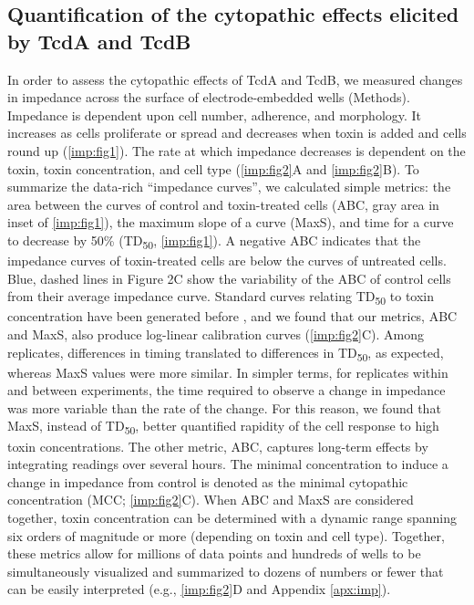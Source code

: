 \subsection{Quantification of the cytopathic effects 
              elicited by TcdA and TcdB}
In order to assess the cytopathic effects of TcdA and TcdB, 
we measured changes in impedance across the surface of 
electrode-embedded wells (Methods). Impedance is dependent 
upon cell number, adherence, and morphology. It increases 
as cells proliferate or spread and decreases when toxin is 
added and cells round up (\autoref{imp:fig1}). The rate at which impedance 
decreases is dependent on the toxin, toxin concentration, and cell 
type (\autoref{imp:fig2}A and \autoref{imp:fig2}B). To summarize the data-rich 
``impedance curves'', we calculated simple metrics: the 
area between the curves of control and toxin-treated cells 
(ABC, gray area in inset of \autoref{imp:fig1}), the maximum slope of 
a curve (MaxS), and time for a curve to decrease by 50\% (TD\textsubscript{50}, 
\autoref{imp:fig1}). A negative ABC indicates that the impedance curves 
of toxin-treated cells are below the curves of untreated 
cells. Blue, dashed lines in Figure 2C show the variability 
of the ABC of control cells from their average impedance 
curve. Standard curves relating TD\textsubscript{50} to toxin concentration 
have been generated before \cite{Xu:2012db}, and we found that our 
metrics, ABC and MaxS, also produce log-linear calibration 
curves (\autoref{imp:fig2}C). Among replicates, differences in 
timing translated to differences in TD\textsubscript{50}, as expected, 
whereas MaxS values were more similar. In simpler terms, 
for replicates within and between experiments, the time 
required to observe a change in impedance was more 
variable than the rate of the change. For this reason, 
we found that MaxS, instead of TD\textsubscript{50}, better quantified 
rapidity of the cell response to high toxin concentrations. 
The other metric, ABC, captures long-term effects by 
integrating readings over several hours. The minimal 
concentration to induce a change in impedance from control 
is denoted as the minimal cytopathic concentration 
(MCC; \autoref{imp:fig2}C). When ABC and MaxS are considered together, 
toxin concentration can be determined with a dynamic 
range spanning six orders of magnitude or more (depending 
on toxin and cell type). Together, these metrics allow 
for millions of data points and hundreds of wells to be 
simultaneously visualized and summarized to dozens of numbers 
or fewer that can be easily interpreted (e.g., \autoref{imp:fig2}D 
and Appendix \autoref{apx:imp}).

